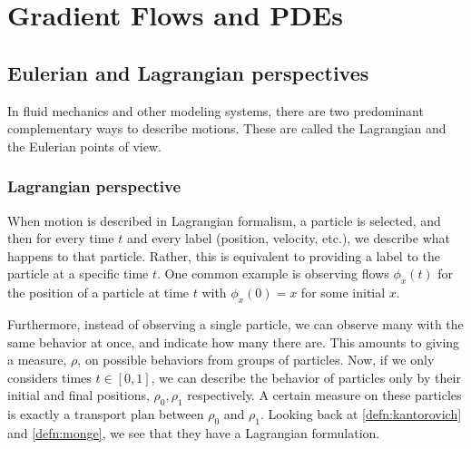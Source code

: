 \documentclass[12pt]{article}
\newcommand{\R}{\mathbb{R}}
\theoremstyle{plain}
\newtheorem{defn}{Definition}[section]
\numberwithin{equation}{section}
\begin{document}
\section{Gradient Flows and PDEs}
\subsection{Eulerian and Lagrangian perspectives}
In fluid mechanics and other modeling systems, there are two predominant complementary ways to describe motions. These are called the Lagrangian and the Eulerian points of view.
\subsubsection{Lagrangian perspective}
When motion is described in Lagrangian formalism, a particle is selected, and then for every time $t$ and every label (position, velocity, etc.), we describe what happens to that particle. Rather, this is equivalent to 
providing a label to the particle at a specific time $t$. One common example is observing flows $\phi_x(t)$ for the position of a particle at time $t$ with $\phi_x(0) = x$ for some initial $x$.

Furthermore, instead of observing a single particle, we can observe many with the same behavior at once, and indicate how many there are. This amounts to giving a measure, $\rho$, on possible behaviors from groups of particles.
Now, if we only considers times $t\in [0,1]$, we can describe the behavior of particles only by their initial and final positions, $\rho_0,\rho_1$ respectively. A certain measure on these particles is exactly a transport plan between 
$\rho_0$ and $\rho_1$. Looking back at \autoref{defn:kantorovich} and \autoref{defn:monge}, we see that they have a Lagrangian formulation.
\end{document}

